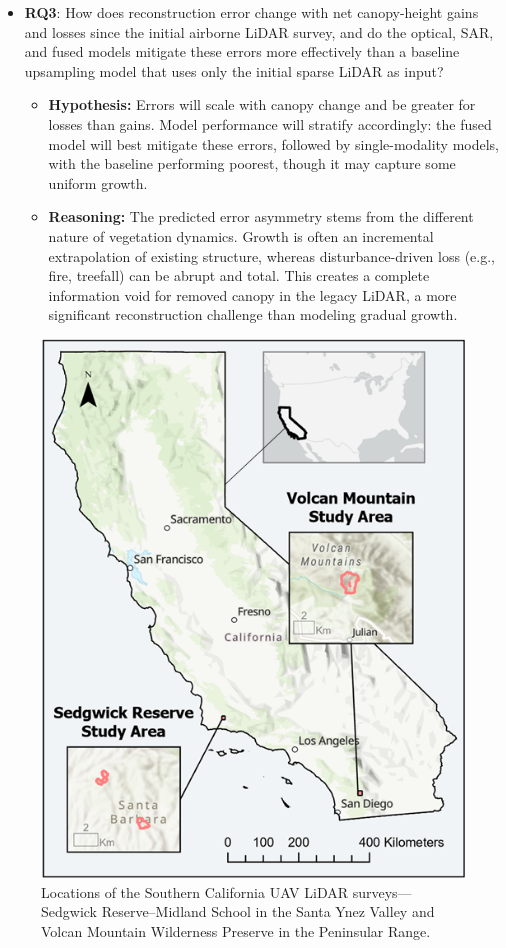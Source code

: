 \documentclass[remotesensing,article,submit,pdftex,moreauthors]{Definitions/mdpi}
\begin{document}
\begin{itemize}
  \item \textbf{RQ3}: How does reconstruction error change with net canopy-height gains and losses since the initial airborne LiDAR survey, and do the optical, SAR, and fused models mitigate these errors more effectively than a baseline upsampling model that uses only the initial sparse LiDAR as input?
        \begin{itemize}
            \item \textbf{Hypothesis:} Errors will scale with canopy change and be greater for losses than gains. Model performance will stratify accordingly: the fused model will best mitigate these errors, followed by single-modality models, with the baseline performing poorest, though it may capture some uniform growth.
            \item \textbf{Reasoning:} The predicted error asymmetry stems from the different nature of vegetation dynamics. Growth is often an incremental extrapolation of existing structure, whereas disturbance-driven loss (e.g., fire, treefall) can be abrupt and total. This creates a complete information void for removed canopy in the legacy LiDAR, a more significant reconstruction challenge than modeling gradual growth.
        \end{itemize}
\end{itemize}

\begin{figure}[!t]
  \centering
  \includegraphics[width=0.65\linewidth]{manuscript/figures/Overall_Study_Areas_v2.png}
    \caption{Locations of the Southern California UAV LiDAR surveys—Sedgwick
           Reserve–Midland School in the Santa Ynez Valley and Volcan Mountain
           Wilderness Preserve in the Peninsular Range.}
  \label{fig:overall_study_area}
\end{figure}
\end{document}
